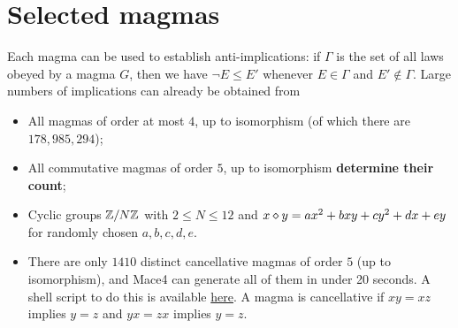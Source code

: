 \chapter{Selected magmas}\label{selected-magmas-chapter}

Each magma can be used to establish anti-implications: if $\Gamma$ is the set of all laws obeyed by a magma $G$, then we have $\neg E \leq E'$ whenever $E \in \Gamma$ and $E' \not \in \Gamma$.  Large numbers of implications can already be obtained from

\begin{itemize}
  \item All magmas of order at most $4$, up to isomorphism (of which there are $178,985,294$);
  \item All commutative magmas of order $5$, up to isomorphism {\bf determine their count};
  \item Cyclic groups $\mathbb{Z}/N\mathbb{Z}$ with $2 \leq N \leq 12$ and $x \diamond y = ax^2+bxy+cy^2+dx+ey$ for randomly chosen $a,b,c,d,e$.
  \item There are only $1410$ distinct cancellative magmas of order $5$ (up to isomorphism), and Mace4 can generate all of them in under 20 seconds. A shell script to do this is available \href{https://github.com/zaklogician/equational_theories/tree/cancellative_magmas/scripts/cancellative_magmas}{here}. A magma is cancellative if $xy=xz$ implies $y=z$ and $yx=zx$ implies $y=z$.
\end{itemize}


